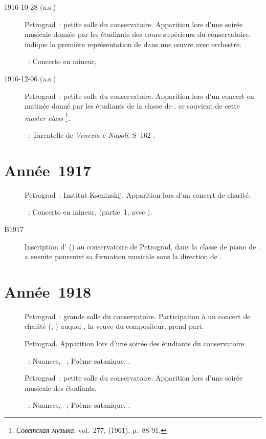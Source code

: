 \begin{description}
 \item[1916-10-28 (a.s.)]
 Petrograd~: petite salle du conservatoire.
 Apparition lors d'une soirée musicale donnée par les étudiants des cours
 supérieurs du conservatoire.
 \citet[p.~7]{Artese} indique la première représentation de \VSofronitsky{}
 dans une œuvre avec orchestre.

 \textsc{\Rachmaninov{}}~: Concerto  en \kF \Sharp mineur,
 .
 \item[1916-12-06 (a.s.)]
 Petrograd~: petite salle du conservatoire.
 Apparition lors d'un concert en matinée donné par les étudiants de la
 classe de \LNikolaiev{}.
 \citet[p.~88-89]{Savshinsky61} se souvient de cette \emph{master class}%
 \footnote{\foreignlanguage{russian}{\emph{Советская музыка}}, vol.~277,
  (1961), p.~88-91.}.

 \textsc{\Liszt{}}~: Tarentelle de \emph{Venezia e Napoli}, S~162
 .
\end{description}

\section{Année~1917}

\begin{description}
 \item[]
 Petrograd~: Institut Kseninskij.
 Apparition lors d'un concert de charité.

 \textsc{\Rachmaninov{}}~: Concerto  en \kF \Sharp mineur,
  (partie~1, avec \LNikolaiev{}).
 \item[B1917]
 Inscription d'\EScriabina{} () au conservatoire de
 Petrograd, dans la classe de piano de \LNikolaiev{}.
 \EScriabina{} a ensuite poursuivi sa formation musicale sous la direction
 de \KIgumnov{} \citep[voir][p.~142]{Nekrasova08}.
\end{description}

\section{Année~1918}

\begin{description}
 \item[]
 Petrograd~: grande salle du conservatoire.
 Participation à un concert de charité (\Medtner{}, \Scriabine{}) auquel
 \VScriabina{}, la veuve du compositeur, prend part.
 \item[]
 Petrograd.
 Apparition lors d'une soirée des étudiants du conservatoire.

 \textsc{\Scriabine{}}~: Nuances,  ~; Poème satanique,
 .
 \item[]
 Petrograd~: petite salle du conservatoire.
 Apparition lors d'une soirée musicale des étudiants.

 \textsc{\Scriabine{}}~: Nuances,  ~; Poème satanique,
 .
\end{description}


